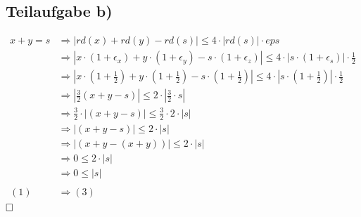 \documentclass{llncs}
\begin{document}
\subsection*{Teilaufgabe b)}

\begin{align*}
x+y = s &\Rightarrow |rd(x) + rd(y) - rd(s)| \leq 4 \cdot |rd(s)| \cdot eps \\
        &\Rightarrow | x \cdot (1+\epsilon_x) + y \cdot (1+\epsilon_y) - s \cdot (1+\epsilon_z) | \leq 4 \cdot |s \cdot (1+\epsilon_s)| \cdot \frac{1}{2} \\
        &\Rightarrow | x \cdot (1+\frac{1}{2}) + y \cdot (1+\frac{1}{2}) - s \cdot (1+\frac{1}{2}) | \leq 4 \cdot |s \cdot (1+\frac{1}{2})| \cdot \frac{1}{2} \\
        &\Rightarrow | \frac{3}{2} (x+y-s) | \leq 2 \cdot | \frac{3}{2} \cdot s| \\
        &\Rightarrow \frac{3}{2} \cdot | (x+y-s) | \leq \frac{3}{2} \cdot 2 \cdot |s| \\
        &\Rightarrow | (x+y-s) | \leq 2 \cdot |s| \\
        &\Rightarrow | (x+y-(x+y)) | \leq 2 \cdot |s| \\
        &\Rightarrow 0 \leq 2 \cdot |s| \\
        &\Rightarrow 0 \leq |s| \\
        \\
        (1) &\Rightarrow (3)
\end{align*}
$\hfill \square$
\end{document}
